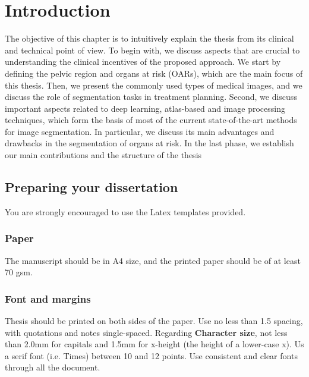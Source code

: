 \chapter{Introduction} \label{chap:intro}
The objective of this chapter is to intuitively explain the thesis from its clinical and technical 
point of view. To begin with, we discuss aspects that are crucial to understanding the clinical
incentives of the proposed approach. We start by defining the pelvic region and organs at risk (OARs), which are
the main focus of this thesis. Then, we present the commonly used types of medical
images, and we discuss the role of segmentation tasks in treatment planning.
Second, we discuss important aspects related to deep learning, atlas-based and image processing techniques, 
which form the basis of most of the current state-of-the-art methods for image segmentation. In particular,
we discuss its main advantages and drawbacks in the segmentation of organs at risk.
In the last phase, we establish our main contributions and the structure of the thesis
\section{Preparing your dissertation} \label{sect:thefirst}

You are strongly encouraged to use the Latex templates provided.

\subsection{Paper}
The manuscript should be in A4 size, and the printed paper should
be of at least 70 gsm.

\subsection{Font and margins}
Thesis should be printed on both sides of the paper. Use no less
than 1.5 spacing, with quotations and notes single-spaced.
Regarding \textbf{Character size}, not less than 2.0mm for
capitals and 1.5mm for x-height (the height of a lower-case x). Us
a serif font (i.e. Times) between 10 and 12 points. Use consistent
and clear fonts through all the document.




